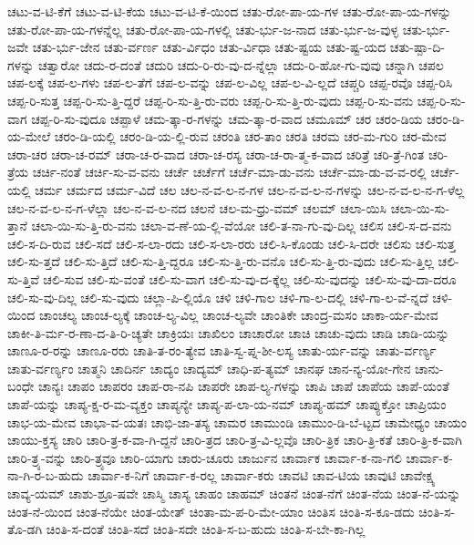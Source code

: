 {ಚಟು-ವ-ಟಿ-ಕೆಗೆ
ಚಟು-ವ-ಟಿ-ಕೆಯ
ಚಟು-ವ-ಟಿ-ಕೆ-ಯಿಂದ
ಚತು-ರೋ-ಪಾ-ಯ-ಗಳ
ಚತು-ರೋ-ಪಾ-ಯ-ಗಳನ್ನು
ಚತು-ರೋ-ಪಾ-ಯ-ಗಳನ್ನೆಲ್ಲ
ಚತು-ರೋ-ಪಾ-ಯ-ಗಳಲ್ಲಿ
ಚತು-ರ್ಭು-ಜ-ನಾದ
ಚತು-ರ್ಭು-ಜ-ವುಳ್ಳ
ಚತು-ರ್ಭು-ಜವೇ
ಚತು-ರ್ಭು-ಜೇನ
ಚತು-ರ್ವರ್ಣ
ಚತು-ರ್ವಿಧಂ
ಚತು-ರ್ವಿಧಾ
ಚತು-ಷ್ಟಯ
ಚತು-ಷ್ಟ-ಯದ
ಚತು-ಷ್ಪಾ-ದಿ-ಗಳನ್ನು
ಚತ್ವಾರೋ
ಚದು-ರ-ದಂತೆ
ಚದುರಿ
ಚದು-ರಿ-ರು-ವು-ದ-ನ್ನೆಲ್ಲಾ
ಚದು-ರಿ-ಹೋ-ಗು-ವುವು
ಚನ್ನಾಗಿ
ಚಪಲ
ಚಪ-ಲಕ್ಕೆ
ಚಪ-ಲ-ಗಳು
ಚಪ-ಲ-ತೆಗೆ
ಚಪ-ಲ-ವನ್ನು
ಚಪ-ಲ-ವಿಲ್ಲ
ಚಪ-ಲ-ವಿ-ಲ್ಲದೆ
ಚಪ್ಚರಿ
ಚಪ್ಪ-ರವೊ
ಚಪ್ಪ-ರಿಸಿ
ಚಪ್ಪ-ರಿ-ಸುತ್ತ
ಚಪ್ಪ-ರಿ-ಸು-ತ್ತಿ-ದ್ದರೆ
ಚಪ್ಪ-ರಿ-ಸು-ತ್ತಿ-ರು-ವರು
ಚಪ್ಪ-ರಿ-ಸು-ತ್ತಿ-ರು-ವುದು
ಚಪ್ಪ-ರಿ-ಸು-ವನು
ಚಪ್ಪ-ರಿ-ಸು-ವಾಗ
ಚಪ್ಪ-ರಿ-ಸು-ವುದೂ
ಚಪ್ಪಾಳೆ
ಚಮ-ತ್ಕಾ-ರ-ಗಳನ್ನು
ಚಮ-ತ್ಕಾ-ರ-ವಾದ
ಚಮೂಮ್
ಚರ
ಚರಂ-ಡಿಯ
ಚರಂ-ಡಿ-ಯ-ಮೇಲೆ
ಚರಂ-ಡಿ-ಯಲ್ಲಿ
ಚರಂ-ಡಿ-ಯ-ಲ್ಲಿ-ರುವ
ಚರಂತಿ
ಚರ-ತಾಂ
ಚರತಿ
ಚರಮ
ಚರ-ಮ-ಗುರಿ
ಚರ-ಮೇವ
ಚರಾ-ಚರ
ಚರಾ-ಚ-ರಮ್
ಚರಾ-ಚ-ರ-ವಾದ
ಚರಾ-ಚ-ರಸ್ಯ
ಚರಾ-ಚ-ರಾ-ತ್ಮ-ಕ-ವಾದ
ಚರಿತ್ರೆ
ಚರಿ-ತ್ರೆ-ಗಿಂತ
ಚರಿ-ತ್ರೆಯ
ಚರ್ಚಿ-ನಂತೆ
ಚರ್ಚಿ-ಸು-ವ-ವನು
ಚರ್ಚೆ
ಚರ್ಚೆಗೆ
ಚರ್ಚೆ-ಮಾ-ಡು-ವನು
ಚರ್ಚೆ-ಮಾ-ಡು-ವ-ವ-ರಲ್ಲಿ
ಚರ್ಚೆ-ಯಲ್ಲಿ
ಚರ್ಮ
ಚರ್ಮದ
ಚರ್ಮ-ವಿದೆ
ಚಲ
ಚಲ-ನ-ವ-ಲ-ನ-ಗಳ
ಚಲ-ನ-ವ-ಲ-ನ-ಗಳನ್ನು
ಚಲ-ನ-ವ-ಲ-ನ-ಗ-ಳೆಲ್ಲ
ಚಲ-ನ-ವ-ಲ-ನ-ಗ-ಳೆಲ್ಲಾ
ಚಲ-ನ-ವ-ಲ-ನದ
ಚಲನೆ
ಚಲ-ಮ-ಧ್ರು-ವಮ್
ಚಲಮ್
ಚಲಾ-ಯಿಸಿ
ಚಲಾ-ಯಿ-ಸು-ತ್ತಾನೆ
ಚಲಾ-ಯಿ-ಸು-ತ್ತಿ-ರು-ವನು
ಚಲಾ-ವ-ಣೆ-ಯ-ಲ್ಲಿ-ವೆಯೋ
ಚಲಿ-ತ-ನಾ-ಗು-ವು-ದಿಲ್ಲ
ಚಲಿಸ
ಚಲಿ-ಸ-ದ-ವನು
ಚಲಿ-ಸ-ದಿ-ರುವ
ಚಲಿ-ಸದೆ
ಚಲಿ-ಸ-ಲಾ-ರದು
ಚಲಿ-ಸ-ಲಾ-ರರು
ಚಲಿ-ಸಿ-ಕೊಂಡು
ಚಲಿ-ಸಿ-ದರೇ
ಚಲಿಸು
ಚಲಿ-ಸುತ್ತ
ಚಲಿ-ಸು-ತ್ತದೆ
ಚಲಿ-ಸು-ತ್ತಿದೆ
ಚಲಿ-ಸು-ತ್ತಿ-ದ್ದರೂ
ಚಲಿ-ಸು-ತ್ತಿ-ರು-ವನೊ
ಚಲಿ-ಸು-ತ್ತಿ-ರು-ವುದು
ಚಲಿ-ಸು-ತ್ತಿಲ್ಲ
ಚಲಿ-ಸು-ತ್ತಿವೆ
ಚಲಿ-ಸುವ
ಚಲಿ-ಸು-ವಂತೆ
ಚಲಿ-ಸು-ವಾಗ
ಚಲಿ-ಸು-ವು-ದ-ಕ್ಕೆಲ್ಲ
ಚಲಿ-ಸು-ವುದನ್ನು
ಚಲಿ-ಸು-ವು-ದಾ-ದರೂ
ಚಲಿ-ಸು-ವು-ದಿಲ್ಲ
ಚಲಿ-ಸು-ವುದು
ಚಲ್ಲಾ-ಪಿ-ಲ್ಲಿಯೊ
ಚಳಿ
ಚಳಿ-ಗಾಲ
ಚಳಿ-ಗಾ-ಲ-ದಲ್ಲಿ
ಚಳಿ-ಗಾ-ಲ-ವೆ-ನ್ನದೆ
ಚಳಿ-ಯಿಂದ
ಚಾಂಚಲ್ಯ
ಚಾಂಚ-ಲ್ಯಕ್ಕೆ
ಚಾಂಚ-ಲ್ಯ-ವಿಲ್ಲ
ಚಾಂಚ-ಲ್ಯವೇ
ಚಾಂತಿಕೇ
ಚಾಂದ್ರ-ಮಸಂ
ಚಾಕಾ-ರ್ಯ-ಮೇವ
ಚಾಕೀ-ತಿ-ರ್ಮ-ರ-ಣಾ-ದ-ತಿ-ರಿ-ಚ್ಯತೇ
ಚಾಕ್ರಿಯಃ
ಚಾಖಿಲಂ
ಚಾಚಾರೋ
ಚಾಚಿ
ಚಾಚು-ವುದು
ಚಾಡಿ
ಚಾಡಿ-ಯನ್ನು
ಚಾಣೂ-ರ-ರನ್ನು
ಚಾಣೂ-ರರು
ಚಾತಿ-ತ-ರಂ-ತ್ಯೇವ
ಚಾತಿ-ಸ್ವ-ಪ್ನ-ಶೀ-ಲಸ್ಯ
ಚಾತು-ರ್ಯ-ವನ್ನು
ಚಾತು-ರ್ವರ್ಣ್ಯ
ಚಾತು-ರ್ವರ್ಣ್ಯಂ
ಚಾತ್ಮನಿ
ಚಾದಿರ್ನ
ಚಾದ್ಯಂ
ಚಾದ್ಯಮ್
ಚಾಧಿ-ಪ-ತ್ಯಮ್
ಚಾನಘ
ಚಾನ-ನ್ಯ-ಯೋ-ಗೇನ
ಚಾನು-ಬಂಧೇ
ಚಾನ್ಯಃ
ಚಾಪಂ
ಚಾಪರಂ
ಚಾಪ-ರಾ-ನಪಿ
ಚಾಪರೇ
ಚಾಪ-ಲ್ಯ-ಗಳನ್ನು
ಚಾಪಿ
ಚಾಪೆ
ಚಾಪೆಯ
ಚಾಪೆ-ಯಂತೆ
ಚಾಪೆ-ಯನ್ನು
ಚಾಪ್ಯ-ಕ್ಷ-ರ-ಮ-ವ್ಯಕ್ತಂ
ಚಾಪ್ಯನ್ಯೇ
ಚಾಪ್ಯ-ಪ-ಲಾ-ಯ-ನಮ್
ಚಾಪ್ಯ-ಹಮ್
ಚಾಪ್ಯುಕ್ತೋ
ಚಾಪ್ರಿಯಂ
ಚಾಭ-ಯ-ಮೇವ
ಚಾಭಾ-ವ-ಯತಃ
ಚಾಭಿ-ಜಾ-ತಸ್ಯ
ಚಾಮರ
ಚಾಮುಂಡಿ
ಚಾಮುಂ-ಡಿ-ಬೆ-ಟ್ಟದ
ಚಾಮೇಧ್ಯಂ
ಚಾಯಂ
ಚಾಯು-ಕ್ತಸ್ಯ
ಚಾರಿ
ಚಾರಿ-ತ್ರ-ಕ-ವಾ-ಗಿ-ದ್ದನೆ
ಚಾರಿ-ತ್ರದ
ಚಾರಿ-ತ್ರ-ವಿ-ಲ್ಲವೊ
ಚಾರಿ-ತ್ರಿಕ
ಚಾರಿ-ತ್ರಿ-ಕತೆ
ಚಾರಿ-ತ್ರಿ-ಕ-ವಾಗಿ
ಚಾರಿ-ತ್ರ್ಯ-ವನ್ನು
ಚಾರಿ-ತ್ರ್ಯವೂ
ಚಾರಿ-ಯಾಗು
ಚಾರು-ಚೂರು
ಚಾರ್ಜುನ
ಚಾರ್ವಾಕ
ಚಾರ್ವಾ-ಕ-ನಾ-ಗಲಿ
ಚಾರ್ವಾ-ಕ-ನಾ-ಗಿ-ರ-ಬ-ಹುದು
ಚಾರ್ವಾ-ಕ-ನಿಗೆ
ಚಾರ್ವಾ-ಕ-ರಲ್ಲ
ಚಾರ್ವಾ-ಕರು
ಚಾವಟಿ
ಚಾವ-ಟಿಯ
ಚಾವುಟಿ
ಚಾವೇಕ್ಷ್ಯ
ಚಾವ್ಯ-ಯಮ್
ಚಾಶು-ಶ್ರೂ-ಷವೇ
ಚಾಸ್ಮಿ
ಚಾಸ್ಯ
ಚಾಹಂ
ಚಾಹಮ್
ಚಿಂತನೆ
ಚಿಂತ-ನೆಗೆ
ಚಿಂತ-ನೆಯ
ಚಿಂತ-ನೆ-ಯನ್ನು
ಚಿಂತ-ನೆ-ಯಿಂದ
ಚಿಂತ-ನೆಯೇ
ಚಿಂತ-ಯೇತ್
ಚಿಂತಾ-ಮ-ಪ-ರಿ-ಮೇ-ಯಾಂ
ಚಿಂತಿಸ
ಚಿಂತಿ-ಸ-ಕೂ-ಡದು
ಚಿಂತಿ-ಸ-ತೊ-ಡಗಿ
ಚಿಂತಿ-ಸ-ದಂತೆ
ಚಿಂತಿ-ಸದೆ
ಚಿಂತಿ-ಸದೇ
ಚಿಂತಿ-ಸ-ಬ-ಹುದು
ಚಿಂತಿ-ಸ-ಬೇ-ಕಾ-ಗಿಲ್ಲ
}
